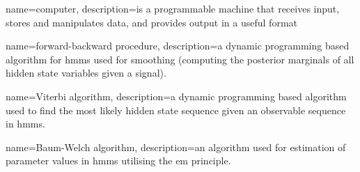%
%
%
{
	name=computer,
	description={is a programmable machine that receives input,
		stores and manipulates data, and provides
		output in a useful format}
}

{
	name={forward-backward procedure},
	description={a dynamic programming based algorithm for \glspl{hmm} used for smoothing (computing the posterior marginals of all hidden state variables given a signal).}
}

{
	name={Viterbi algorithm},
	description={a dynamic programming based algorithm used to find the most likely hidden state sequence given an observable sequence in \glspl{hmm}.}
}
	
{
	name={Baum-Welch algorithm},
	description={an algorithm used for estimation of parameter values in \glspl{hmm} utilising the \gls{em} principle.}
}
%
%
%
%
%


%
%
%
